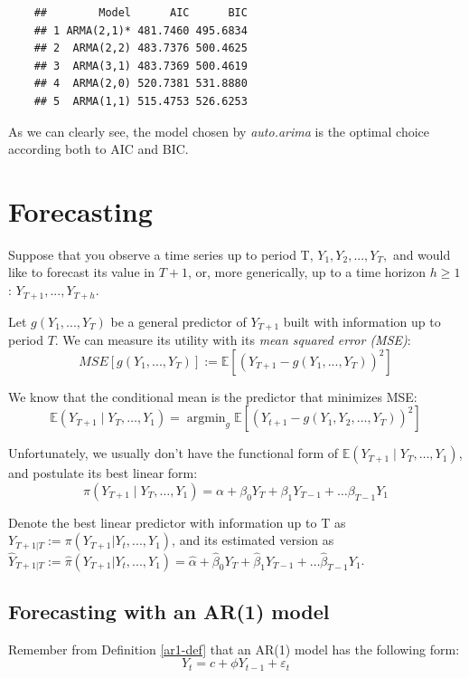 \documentclass[11pt, a4paper]{report}
\theoremstyle{plain}
\theoremstyle{plain}
\theoremstyle{remark}
\begin{document}
\begin{verbatim}
	##        Model      AIC      BIC
	## 1 ARMA(2,1)* 481.7460 495.6834
	## 2  ARMA(2,2) 483.7376 500.4625
	## 3  ARMA(3,1) 483.7369 500.4619
	## 4  ARMA(2,0) 520.7381 531.8880
	## 5  ARMA(1,1) 515.4753 526.6253
\end{verbatim}

As we can clearly see, the model chosen by \emph{auto.arima} is the
optimal choice according both to AIC and BIC.




\chapter{Forecasting}

Suppose that you observe a time series up to period T, $Y_1, Y_2, ..., Y_T,$ and would like to forecast its value in $T+1$, or, more generically, up to a time horizon $h \geq 1$: $Y_{T+1}, ..., Y_{T+h}$.

Let $g(Y_1, ..., Y_T)$ be a general predictor of $Y_{T+1}$ built with information up to period $T$. We can measure its utility with its \textit{mean squared error (MSE)}:
$$ MSE[g(Y_1, ..., Y_T)] := \mathbb{E}[(Y_{T+1} - g(Y_1, ..., Y_T))^2] $$

We know that the conditional mean is the predictor that minimizes MSE:
$$\mathbb{E}\left(Y_{T+1} \mid Y_{T}, \ldots, Y_{1}\right)=\operatorname{argmin}_{g} \mathbb{E}\left[\left(Y_{t+1}-g\left(Y_{1}, Y_{2}, \ldots, Y_{T}\right)\right)^{2}\right]$$

Unfortunately, we usually don't have the functional form of $\mathbb{E}\left(Y_{T+1} \mid Y_{T}, \ldots, Y_{1}\right)$, and postulate its best linear form:
$$\pi\left(Y_{T+1} \mid Y_{T}, \ldots, Y_{1}\right)=\alpha+\beta_{0} Y_{T}+\beta_{1} Y_{T-1}+\ldots \beta_{T-1} Y_{1}$$

Denote the best linear predictor with information up to T as $Y_{T+1|T} := \pi(Y_{T+1}|Y_t,..., Y_1)$, and its estimated version as $\hat{Y}_{T+1|T} := \hat{\pi}(Y_{T+1}|Y_t,..., Y_1) = \hat{\alpha}+\hat{\beta}_{0} Y_{T}+\hat{\beta}_{1} Y_{T-1}+\ldots \hat{\beta}_{T-1} Y_{1}$.

\section{Forecasting with an AR(1) model}

Remember from Definition \ref{ar1-def} that an AR(1) model has the following form:
$$ Y_t = c + \phi Y_{t-1} + \varepsilon_{t}$$
\end{document}
